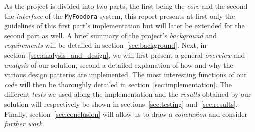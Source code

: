 As the project is divided into two parts, the first being the \emph{core}
and the second the \emph{interface} of the \lstinline|MyFoodora| system,
this report presents at first only the guidelines of this first part's implementation but will later 
be extended for the second part as well.
A brief summary of the project's \emph{background} and \emph{requirements} will
be detailed in section~\ref{sec:background}.
Next, in section~\ref{sec:analysis_and_design}, we will first present
a general \emph{overview} and \emph{analysis} of our solution, second a detailed 
explanation of how and why the various design patterns are implemented.
The most interesting functions of our \emph{code} will then be
thoroughly detailed in section~\ref{sec:implementation}.
The different \emph{tests} we used along the implementation
and the \emph{results} obtained by our solution will respectively
be shown in sections~\ref{sec:testing} and~\ref{sec:results}.
Finally, section~\ref{sec:conclusion} will allow us to draw 
a \emph{conclusion} and consider \emph{further work}.

